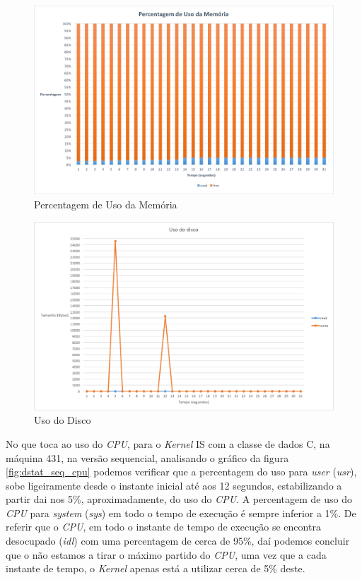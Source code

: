 \documentclass[conference,compsoc]{IEEEtran}
\begin{document}
\begin{figure}[h!]
\centering
\includegraphics[scale=0.325]{dstat/SER/dstat_seq_memoria.png}
\caption{Percentagem de Uso da Memória}
\label{fig:dstat_seq_memoria}
\end{figure}

\begin{figure}[h!]
\centering
\includegraphics[scale=0.325]{dstat/SER/dstat_seq_disco.png}
\caption{Uso do Disco}
\label{fig:dstat_seq_disco}
\end{figure}

No que toca ao uso do \textit{CPU}, para o \textit{Kernel} IS com a classe de dados C, na máquina 431, na versão sequencial, analisando o gráfico da figura \ref{fig:dstat_seq_cpu} podemos verificar que a percentagem do uso para \textit{user} (\textit{usr}), sobe ligeiramente desde o instante inicial até aos 12 segundos, estabilizando a partir dai nos 5\%, aproximadamente, do uso do \textit{CPU}. A percentagem de uso do \textit{CPU} para \textit{system} (\textit{sys}) em todo o tempo de execução é sempre inferior a 1\%. De referir que o \textit{CPU}, em todo o instante de tempo de execução se encontra desocupado (\textit{idl}) com uma percentagem de cerca de 95\%, daí podemos concluir que o não estamos a tirar o máximo partido do \textit{CPU}, uma vez que a cada instante de tempo, o \textit{Kernel} apenas está a utilizar cerca de 5\% deste.
\end{document}
